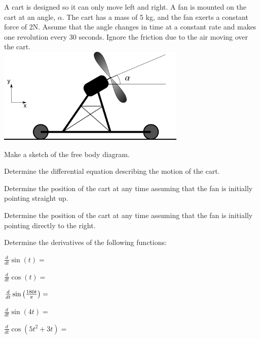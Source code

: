 \begin{problem}
\end{problem}

\begin{problem}
\item A cart is designed so it can only move left and right. A fan is
  mounted on the cart at an angle, $\alpha$. The cart has a mass of 5
  kg, and the fan exerts a constant force of 2N. Assume that the angle
  changes in time at a constant rate and makes one revolution every 30
  seconds. Ignore the friction due to the air moving
  over the cart.  \\
  \includegraphics[width=9cm]{ink/week6/airCart}
  \begin{subproblem}
    \item Make a sketch of the free body diagram.
      \vfill
    \item Determine the differential equation describing the motion
      of the cart.
      \vfill
      \clearpage
    \item Determine the position of the cart at any time assuming that
      the fan is initially pointing straight up.
      \vfill
    \item Determine the position of the cart at any time assuming that
      the fan is initially pointing directly to the right.
      \vfill
  \end{subproblem}

  \clearpage

\item Determine the derivatives of the following functions:
  \begin{subproblem}
    \item $\frac{d}{dt} \sin(t) = $ 
      \vfill
    \item $\frac{d}{dt} \cos(t) = $ 
      \vfill
    \item $\frac{d}{dt} \sin\left( \frac{180 t}{\pi}  \right) = $ 
      \vfill
    \item $\frac{d}{dt} \sin(4t) = $ 
      \vfill
    \item $\frac{d}{dt} \cos(5t^2+3t) = $ 
      \vfill
  \end{subproblem}


\end{problem}
